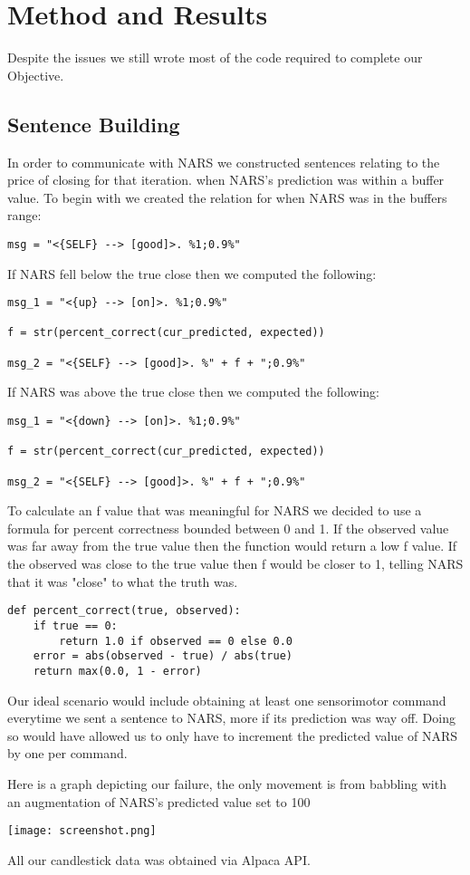 \documentclass{article}
\begin{document}
\section{Method and Results}
Despite the issues we still wrote most of the code required to complete our Objective.

\subsection*{Sentence Building}
In order to communicate with NARS we constructed sentences relating to the price of closing
for that iteration. when NARS's prediction was within a buffer value. To begin with we
created the relation for when NARS was in the buffers range:

\begin{lstlisting}
msg = "<{SELF} --> [good]>. %1;0.9%"
\end{lstlisting}

If NARS fell below the true close then we computed the following:
\begin{lstlisting}
msg_1 = "<{up} --> [on]>. %1;0.9%"

f = str(percent_correct(cur_predicted, expected))

msg_2 = "<{SELF} --> [good]>. %" + f + ";0.9%"
\end{lstlisting}

If NARS was above the true close then we computed the following:
\begin{lstlisting}
msg_1 = "<{down} --> [on]>. %1;0.9%"

f = str(percent_correct(cur_predicted, expected))

msg_2 = "<{SELF} --> [good]>. %" + f + ";0.9%"
\end{lstlisting}

To calculate an f value that was meaningful for NARS we decided to use a formula for
percent correctness bounded between 0 and 1. If the observed value was far away from
the true value then the function would return a low f value. If the observed was
close to the true value then f would be closer to 1, telling NARS that it was "close"
to what the truth was.
\begin{lstlisting}[style=Pseudocode, mathescape=true]
def percent_correct(true, observed):
    if true == 0:
        return 1.0 if observed == 0 else 0.0
    error = abs(observed - true) / abs(true)
    return max(0.0, 1 - error)
\end{lstlisting}

Our ideal scenario would include obtaining at least one sensorimotor command everytime we
sent a sentence to NARS, more if its prediction was way off. Doing so would have allowed us
to only have to increment the predicted value of NARS by one per command.

\vspace{3mm}
Here is a graph depicting our failure, the only movement is from babbling with an augmentation
of NARS's predicted value set to 100
\begin{center}
	\texttt{[image: screenshot.png]}
\end{center}

All our candlestick data was obtained via Alpaca API.
\end{document}
